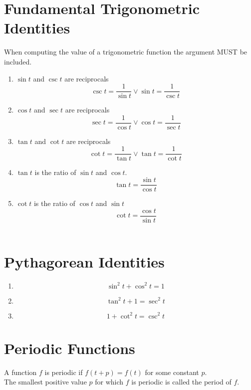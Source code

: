 \documentclass{article}
\begin{document}
\section{Fundamental Trigonometric Identities}
When computing the value of a trigonometric function the argument MUST be
included.
\begin{enumerate}
  \item $\sin t$ and $\csc t$ are reciprocals
    \[\csc t=\frac{1}{\sin t} \lor \sin t=\frac{1}{\csc t}\]
  
  \item $\cos t$ and $\sec t$ are reciprocals
    \[\sec t=\frac{1}{\cos t} \lor \cos t=\frac{1}{\sec t}\]

  \item $\tan t$ and $\cot t$ are reciprocals
    \[\cot t=\frac{1}{\tan t} \lor \tan t=\frac{1}{\cot t}\]

  \item $\tan t$ is the ratio of $\sin t$ and $\cos t$.
    \[\tan t=\frac{\sin t}{\cos t}\]

  \item $\cot t$ is the ratio of $\cos t$ and $\sin t$
    \[\cot t=\frac{\cos t}{\sin t}\]\\
\end{enumerate}

\section{Pythagorean Identities}
\begin{enumerate}
  \item \[\sin^2t+\cos^2t=1\]
  \item \[\tan^2t+1=\sec^2t\]
  \item \[1+\cot^2t=\csc^2t\]
\end{enumerate}

\section{Periodic Functions}
A function $f$ is periodic if $f(t+p)=f(t)$ for some constant $p$.\\
The smallest positive value $p$ for which $f$ is periodic is called the
period of $f$.
\end{document}
